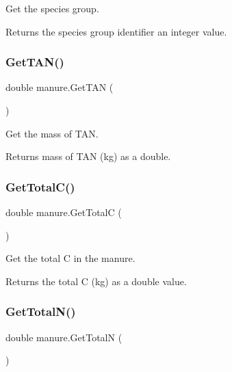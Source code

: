 Get the species group. 

\begin{DoxyReturn}{Returns}
the species group identifier an integer value. 
\end{DoxyReturn}
\mbox{\label{classmanure_a4461f5f0c8d8f868b5e2f78d91e6cb09}} 
\subsubsection{\texorpdfstring{GetTAN()}{GetTAN()}}
{\footnotesize\ttfamily double manure.\+Get\+T\+AN (\begin{DoxyParamCaption}{ }\end{DoxyParamCaption})\hspace{0.3cm}{\ttfamily [inline]}}



Get the mass of T\+AN. 

\begin{DoxyReturn}{Returns}
mass of T\+AN (kg) as a double. 
\end{DoxyReturn}
\mbox{\label{classmanure_aa6535fb2bef7c1d0b4462e61bb699718}} 
\subsubsection{\texorpdfstring{GetTotalC()}{GetTotalC()}}
{\footnotesize\ttfamily double manure.\+Get\+TotalC (\begin{DoxyParamCaption}{ }\end{DoxyParamCaption})\hspace{0.3cm}{\ttfamily [inline]}}



Get the total C in the manure. 

\begin{DoxyReturn}{Returns}
the total C (kg) as a double value. 
\end{DoxyReturn}
\mbox{\label{classmanure_a5a3323a38ff8bf4e8f45bcf7fd22f47c}} 
\subsubsection{\texorpdfstring{GetTotalN()}{GetTotalN()}}
{\footnotesize\ttfamily double manure.\+Get\+TotalN (\begin{DoxyParamCaption}{ }\end{DoxyParamCaption})\hspace{0.3cm}{\ttfamily [inline]}}



